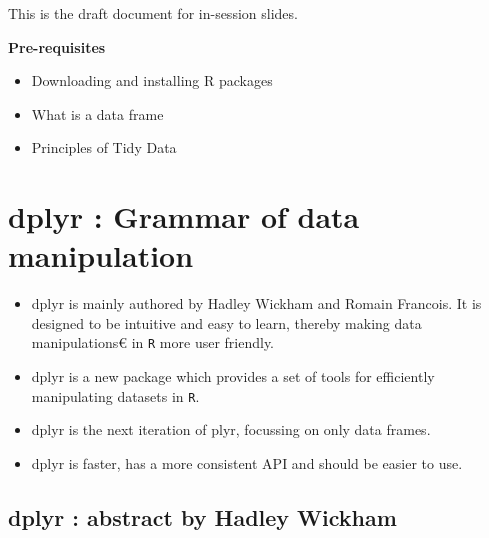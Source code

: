 \documentclass{article}
\begin{document}
	
	\tableofcontents
	\begin{framed}
		This is the draft document for in-session slides.
	\end{framed}
	\textbf{Pre-requisites}
	\begin{itemize}
		\item Downloading and installing R packages
		\item What is a data frame
		\item Principles of Tidy Data
	\end{itemize}
	\newpage
	
	
	
	
	\section{dplyr : Grammar of data manipulation}
	\begin{itemize}
		\item dplyr  is mainly authored by Hadley Wickham and Romain Francois. It is designed to be intuitive and easy to learn, thereby making data manipulations€ in \texttt{R} more user friendly.
		\item dplyr is a new package which provides a set of tools for efficiently manipulating datasets in \texttt{R}.
		\item dplyr is the next iteration of plyr, focussing on only data frames. \item dplyr is faster, has a more consistent API and should be easier to use. 
	\end{itemize}
	
	
	\subsection{dplyr : abstract by Hadley Wickham}
	
\end{document}
